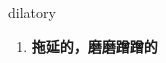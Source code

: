 
\begin{frame}
{\huge dilatory}
\begin{center}
\begin{enumerate}\Large
  \item \textbf{拖延的，磨磨蹭蹭的}
\end{enumerate}
\end{center}
\end{frame}
